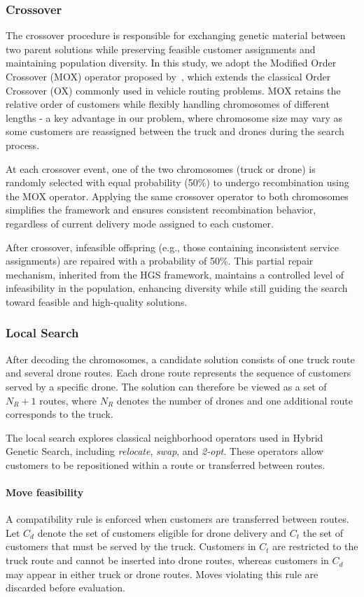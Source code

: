 \documentclass[3p, authoryear, 11pt]{elsarticle}
\begin{document}
\subsubsection{Crossover}
The crossover procedure is responsible for exchanging genetic material between two parent solutions while preserving feasible customer assignments and maintaining population diversity.
In this study, we adopt the Modified Order Crossover (MOX) operator proposed by~\cite{pham_solving_2017}, which extends the classical Order Crossover (OX) commonly used in vehicle routing problems.
MOX retains the relative order of customers while flexibly handling chromosomes of different lengths - a key advantage in our problem, where chromosome size may vary as some customers are reassigned between the truck and drones during the search process.

At each crossover event, one of the two chromosomes (truck or drone) is randomly selected with equal probability (50\%) to undergo recombination using the MOX operator.
Applying the same crossover operator to both chromosomes simplifies the framework and ensures consistent recombination behavior, regardless of current delivery mode assigned to each customer.

After crossover, infeasible offspring (e.g., those containing inconsistent service assignments) are repaired with a probability of 50\%. This partial repair mechanism, inherited from the HGS framework, maintains a controlled level of infeasibility in the population, enhancing diversity while still guiding the search toward feasible and high-quality solutions.

\subsubsection{Local Search}
After decoding the chromosomes, a candidate solution consists of one truck route and several drone routes. 
Each drone route represents the sequence of customers served by a specific drone. 
The solution can therefore be viewed as a set of $N_R + 1$ routes, where $N_R$ denotes the number of drones and one additional route corresponds to the truck.

The local search explores classical neighborhood operators used in Hybrid Genetic Search, including \textit{relocate}, \textit{swap}, and \textit{2-opt}. 
These operators allow customers to be repositioned within a route or transferred between routes.

\paragraph{Move feasibility}
A compatibility rule is enforced when customers are transferred between routes. 
Let $C_d$ denote the set of customers eligible for drone delivery and $C_t$ the set of customers that must be served by the truck. 
Customers in $C_t$ are restricted to the truck route and cannot be inserted into drone routes, whereas customers in $C_d$ may appear in either truck or drone routes. 
Moves violating this rule are discarded before evaluation.
\end{document}
